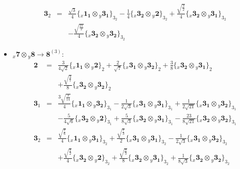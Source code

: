 \documentclass[english]{article}
\newcommand{\rep}[1]{\mathbf{#1}}
\newcommand{\repx}[2]{{}_{#2}\mathbf{#1}}
\newcommand{\subcg}[3]{\big\{ \repx{#1}{x}\otimes\repx{#2}{y}\big\}^{}_{#3}}
\begin{document}
\begin{itemize}
\begin{eqnarray*}
\rep{3}_{2} &=& \frac{\sqrt{3}}{4}\subcg{1_{1}}{3_{1}}{3_{2}}-\frac{1}{4}\subcg{3_{2}}{2}{3_{2}}+\frac{\sqrt{\frac{3}{2}}}{4}\subcg{3_{2}}{3_{1}}{3_{2}} \\ 
 & & -\frac{\sqrt{\frac{21}{2}}}{4}\subcg{3_{2}}{3_{2}}{3_{2}}
\end{eqnarray*}
\item $\repx{7}{x}\otimes\repx{8}{y}\to\rep{8}^{(3)}$:
\begin{eqnarray*}
\rep{2} &=& \frac{3}{4 \sqrt{2}}\subcg{1_{1}}{2}{2}+\frac{2}{\sqrt{7}}\subcg{3_{1}}{3_{2}}{2}+\frac{3}{8}\subcg{3_{2}}{3_{1}}{2} \\ 
 & & +\frac{\sqrt{\frac{3}{7}}}{8}\subcg{3_{2}}{3_{2}}{2}
\\
\rep{3}_{1} &=& \frac{3 \sqrt{\frac{3}{14}}}{4}\subcg{1_{1}}{3_{2}}{3_{1}}-\frac{1}{2 \sqrt{3}}\subcg{3_{1}}{3_{1}}{3_{1}}+\frac{1}{2 \sqrt{21}}\subcg{3_{1}}{3_{2}}{3_{1}} \\ 
 & & -\frac{5}{4 \sqrt{6}}\subcg{3_{2}}{2}{3_{1}}+\frac{5}{8 \sqrt{3}}\subcg{3_{2}}{3_{1}}{3_{1}}-\frac{23}{8 \sqrt{21}}\subcg{3_{2}}{3_{2}}{3_{1}}
\\
\rep{3}_{2} &=& \frac{\sqrt{\frac{7}{6}}}{4}\subcg{1_{1}}{3_{1}}{3_{2}}+\frac{\sqrt{\frac{7}{3}}}{2}\subcg{3_{1}}{3_{1}}{3_{2}}-\frac{1}{2 \sqrt{3}}\subcg{3_{1}}{3_{2}}{3_{2}} \\ 
 & & +\frac{\sqrt{\frac{7}{2}}}{4}\subcg{3_{2}}{2}{3_{2}}+\frac{\sqrt{\frac{7}{3}}}{8}\subcg{3_{2}}{3_{1}}{3_{2}}+\frac{1}{8 \sqrt{3}}\subcg{3_{2}}{3_{2}}{3_{2}}
\end{eqnarray*}
\end{itemize}
\end{document}
